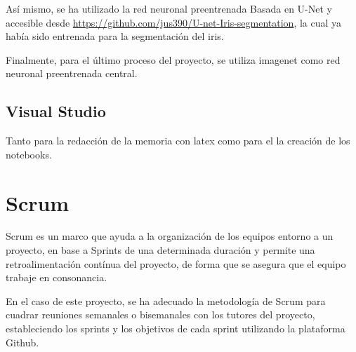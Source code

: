 Así mismo, se ha utilizado la red neuronal preentrenada Basada en U-Net y accesible desde \url{https://github.com/jus390/U-net-Iris-segmentation}, la cual ya había sido
entrenada para la segmentación del iris.

Finalmente, para el último proceso del proyecto, se utiliza imagenet como red neuronal preentrenada central.

\subsection{Visual Studio}

Tanto para la redacción de la memoria con latex como para el la creación de los notebooks.

\section{Scrum}
Scrum es un marco que ayuda a la organización de los equipos entorno a un proyecto, en base a Sprints de una determinada duración y permite una retroalimentación
contínua del proyecto, de forma que se asegura que el equipo trabaje en consonancia.

En el caso de este proyecto, se ha adecuado la metodología de Scrum para cuadrar reuniones semanales o bisemanales con los tutores del proyecto, estableciendo
los sprints y los objetivos de cada sprint utilizando la plataforma Github.





